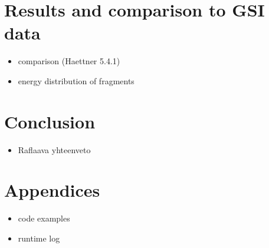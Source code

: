 \section{Results and comparison to GSI data}
\begin{itemize}
\item comparison (Haettner 5.4.1)
\item energy distribution of fragments
\end{itemize}

\section{Conclusion}
\begin{itemize}
\item Raflaava yhteenveto
\end{itemize}

\section{Appendices}
\begin{itemize}
\item code examples
\item runtime log
\end{itemize}





  


\else

\fi